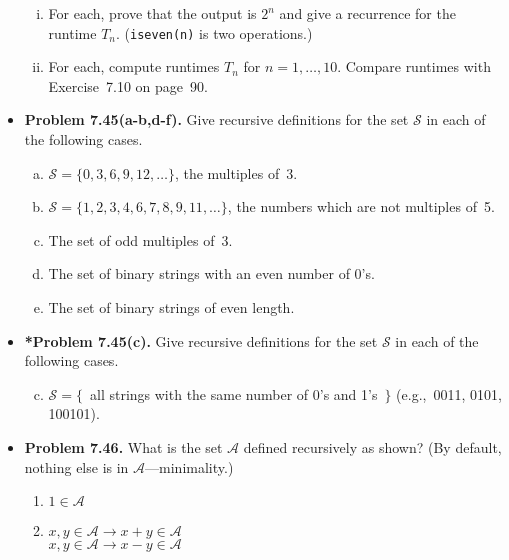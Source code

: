 \documentclass[11pt]{article}
\def\imp{\rightarrow}
\begin{document}
\begin{itemize}
\begin{enumerate}[(i)]
\item For each, prove that the output is $2^n$ and give a recurrence for the runtime $T_n$.
  (\verb+iseven(n)+ is two operations.)
\item For each, compute runtimes $T_n$ for $n=1,\ldots,10$.
  Compare runtimes with Exercise~7.10 on page~90.
\end{enumerate}

\vspace{0.1in}

\item \textbf{Problem 7.45(a-b,d-f).}
Give recursive definitions for the set $\mathcal{S}$ in each of the following cases.
\begin{enumerate}[(a)]
\item $\mathcal{S}=\{0,3,6,9,12,\dots\}$, the multiples of~3.
\item $\mathcal{S}=\{1,2,3,4,6,7,8,9,11,\dots\}$, the numbers which are not multiples of~5.
\setcounter{enumi}{3}
\item The set of odd multiples of~3.
\item The set of binary strings with an even number of 0's.
\item The set of binary strings of even length.
\end{enumerate}

\vspace{0.1in}

\item \textbf{*Problem 7.45(c).}
Give recursive definitions for the set $\mathcal{S}$ in each of the following cases.
\begin{enumerate}[(a)]
\setcounter{enumi}{2}
\item $\mathcal{S}=\{$\ all strings with the same number of 0's and 1's\ $\}$
  (e.g.,~0011, 0101, 100101).
\end{enumerate}

\vspace{0.1in}

\item \textbf{Problem 7.46.}
What is the set $\mathcal{A}$ defined recursively as shown?
(By default, nothing else is in $\mathcal{A}$---minimality.)
\begin{enumerate}[(1)]
\item $1\in\mathcal{A}$
\item $x,y\in\mathcal{A}\imp x+y\in\mathcal{A}$ \\
  $x,y\in\mathcal{A}\imp x-y\in\mathcal{A}$
\end{enumerate}


\end{itemize}
\end{document}
